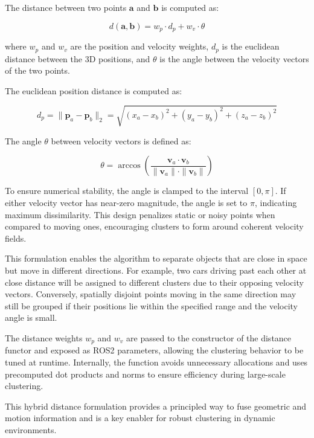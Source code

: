 The distance between two points \(\mathbf{a}\) and \(\mathbf{b}\) is computed as:

\begin{equation}
d(\mathbf{a}, \mathbf{b}) = w_p \cdot d_p + w_v \cdot \theta
\end{equation}

where \(w_p\) and \(w_v\) are the position and velocity weights, \(d_p\) is the
euclidean distance between the 3D positions, and \(\theta\) is the angle between
the velocity vectors of the two points.

The euclidean position distance is computed as:

\begin{equation}
d_p = \| \mathbf{p}_a - \mathbf{p}_b \|_2 = \sqrt{(x_a - x_b)^2 + (y_a - y_b)^2 + (z_a - z_b)^2}
\end{equation}

The angle \(\theta\) between velocity vectors is defined as:

\begin{equation}
\theta = \arccos\left( \frac{ \mathbf{v}_a \cdot \mathbf{v}_b }{ \| \mathbf{v}_a \| \cdot \| \mathbf{v}_b \| } \right)
\end{equation}

To ensure numerical stability, the angle is clamped to the interval \([0, \pi]\). If
either velocity vector has near-zero magnitude, the angle is set to \(\pi\), indicating
maximum dissimilarity. This design penalizes static or noisy points when compared to
moving ones, encouraging clusters to form around coherent velocity fields.

This formulation enables the algorithm to separate objects that are close in space but
move in different directions. For example, two cars driving past each other at close
distance will be assigned to different clusters due to their opposing velocity vectors.
Conversely, spatially disjoint points moving in the same direction may still be grouped
if their positions lie within the specified range and the velocity angle is small.

The distance weights \(w_p\) and \(w_v\) are passed to the constructor of the distance
functor and exposed as ROS2 parameters, allowing the clustering behavior to be tuned
at runtime. Internally, the function avoids unnecessary allocations and uses
precomputed dot products and norms to ensure efficiency during large-scale clustering.

This hybrid distance formulation provides a principled way to fuse geometric and motion
information and is a key enabler for robust clustering in dynamic environments.



